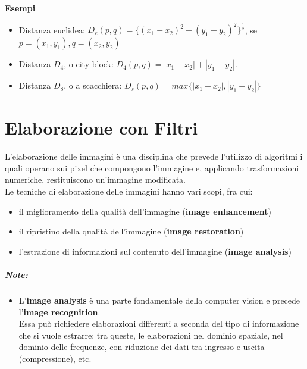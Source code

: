 \textbf{Esempi}

\begin{itemize}
    \item Distanza euclidea: $D_e(p, q) = \{(x_1 - x_2)^2 + (y_1 - y_2)^2\}^{\frac{1}{2}}$, se $p = (x_1, y_1), q=(x_2, y_2)$
    \item Distanza $D_4$, o city-block: $D_4(p, q) = |x_1 - x_2| + |y_1 - y_2|$.
    \item Distanza $D_8$, o a scacchiera: $D_s(p,q) = max\{|x_1 - x_2|, |y_1 - y_2|\}$
\end{itemize}

\chapter{Elaborazione con Filtri}

L'elaborazione delle immagini è una disciplina che prevede l'utilizzo
di algoritmi i quali operano sui pixel che compongono l'immagine
e, applicando trasformazioni numeriche, restituiscono un'immagine
modificata.\\
Le tecniche di elaborazione delle immagini hanno vari scopi, fra cui:

\begin{itemize}
    \item il miglioramento della qualità dell'immagine (\textbf{image enhancement})
    \item il ripristino della qualità dell'immagine (\textbf{image restoration})
    \item l'estrazione di informazioni sul contenuto dell'immagine (\textbf{image analysis})
\end{itemize}

\paragraph{Note:}

\begin{itemize}
    \item L'\textbf{image analysis} è una parte fondamentale della computer vision e
          precede l'\textbf{image recognition}.\\
          Essa può richiedere elaborazioni differenti a seconda del tipo di
          informazione che si vuole estrarre: tra queste, le elaborazioni nel
          dominio spaziale, nel dominio delle frequenze, con riduzione dei
          dati tra ingresso e uscita (compressione), etc.
\end{itemize}

